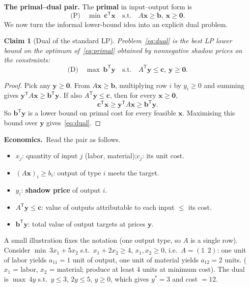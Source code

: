 \documentclass[11pt,a4paper]{article}
\newtheorem{claim}{Claim}
\newcommand{\econ}[1]{\medskip\noindent\textbf{Economics.}\ #1\medskip}
\begin{document}
\textbf{The primal--dual pair.}
The \textbf{primal} in input--output form is
\begin{equation}\label{eq:primal}
  \text{(P)}\quad
  \min\ \mathbf{c}^{\mathsf T}\mathbf{x}
  \quad\text{s.t.}\quad A\mathbf{x}\ge\mathbf{b},\ \mathbf{x}\ge\mathbf{0}.
\end{equation}
We now turn the informal lower-bound idea into an explicit dual problem.

\begin{claim}[Dual of the standard LP]
Problem~\eqref{eq:dual} is the best LP lower bound on the optimum of~\eqref{eq:primal} obtained by
nonnegative shadow prices on the constraints:
\begin{equation}\label{eq:dual}
  \text{(D)}\quad
  \max\ \mathbf{b}^{\mathsf T}\mathbf{y}
  \quad\text{s.t.}\quad A^{\mathsf T}\mathbf{y}\le\mathbf{c},\ \mathbf{y}\ge\mathbf{0}.
\end{equation}
\end{claim}

\begin{proof}
Pick any $\mathbf{y}\ge\mathbf{0}$.
From $A\mathbf{x}\ge\mathbf{b}$, multiplying row $i$ by $y_i\ge 0$ and summing gives
$\mathbf{y}^{\mathsf T}A\mathbf{x}\ge\mathbf{b}^{\mathsf T}\mathbf{y}$.
If also $A^{\mathsf T}\mathbf{y}\le\mathbf{c}$, then for every $\mathbf{x}\ge\mathbf{0}$,
\[
  \mathbf{c}^{\mathsf T}\mathbf{x}\ge \mathbf{y}^{\mathsf T}A\mathbf{x}
  \ge \mathbf{b}^{\mathsf T}\mathbf{y}.
\]
So $\mathbf{b}^{\mathsf T}\mathbf{y}$ is a lower bound on primal cost for every feasible $\mathbf{x}$.
Maximising this bound over $\mathbf{y}$ gives~\eqref{eq:dual}.
\end{proof}

\econ{Read the pair as follows.
\begin{itemize}[nosep,leftmargin=*]
  \item $x_j$: quantity of input $j$ (labor, material);\quad $c_j$: its unit cost.
  \item $(A\mathbf{x})_i\ge b_i$: output of type $i$ meets the target.
  \item $y_i$: \textbf{shadow price} of output $i$.
  \item $A^{\mathsf T}\mathbf{y}\le\mathbf{c}$: value of outputs attributable to each input $\le$ its cost.
  \item $\mathbf{b}^{\mathsf T}\mathbf{y}$: total value of output targets at prices $\mathbf{y}$.
\end{itemize}}

A small illustration fixes the notation (one output type, so $A$ is a single row).
Consider $\min\ 3x_1+5x_2$ s.t.\ $x_1+2x_2\ge 4$, $x_1,x_2\ge 0$, i.e.\ $A=(1\ \ 2)$:
one unit of labor yields $a_{11}=1$ unit of output, one unit of material yields $a_{12}=2$ units.
($x_1$ = labor, $x_2$ = material; produce at least 4 units at minimum cost).
The dual is $\max\ 4y$ s.t.\ $y\le 3$, $2y\le 5$, $y\ge 0$, which gives $y^*=3$ and cost $=12$.
\end{document}
